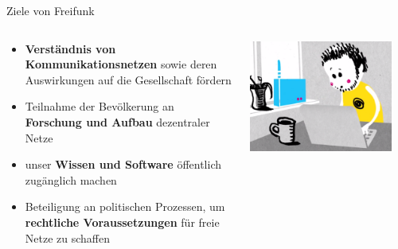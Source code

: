 \documentclass[10pt]{beamer}
\begin{document}
  \begin{frame}{Ziele von Freifunk}
    \begin{columns}[T]
     \begin{column}{5cm}
        \begin{itemize}
          \item \textbf{Verständnis von Kommunikationsnetzen} sowie deren Auswirkungen auf die Gesellschaft fördern
          \item Teilnahme der Bevölkerung an \textbf{Forschung und Aufbau} dezentraler Netze
          \item unser \textbf{Wissen und Software} öffentlich zugänglich machen
          \item Beteiligung an politischen Prozessen, um \textbf{rechtliche Voraussetzungen} für freie Netze zu schaffen
        \end{itemize}
      \end{column}
      \begin{column}{5cm}
        \includegraphics[width=0.9\textwidth]{images/install}
      \end{column}
    \end{columns}
  \end{frame}
\end{document}
